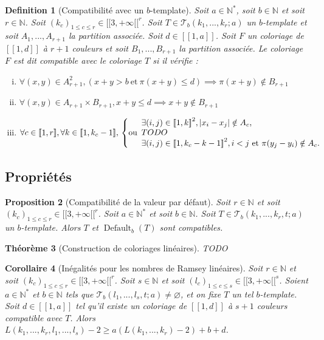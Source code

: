 \documentclass{article}
\newtheorem{definition}{Definition}[section]
\newtheorem{theorem}[definition]{Théorème}
\newtheorem{corollary}[definition]{Corollaire}
\newtheorem{proposition}[definition]{Proposition}
\DeclareMathOperator{\coldef}{Default}
\begin{document}
\begin{definition}[Compatibilité avec un \(b\)-template]
Soit \(a \in \mathbb{N}^*\), soit \(b \in \mathbb{N}\) et soit \(r \in \mathbb{N}\). Soit \((k_c)_{1 \leqslant c \leqslant r} \in {[\![3, + \infty [\![}^r\). Soit \(T \in \mathcal{T}_b(k_1, ..., k_r; a)\) un \(b\)-template et soit \(A_1, ..., A_{r+1}\) la partition associée. Soit \(d \in [\![1, a]\!]\). Soit \(F\) un coloriage de \([\![1, d]\!]\) à \(r +1\) couleurs et soit \(B_1, ..., B_{r + 1}\) la partition associée. Le coloriage \(F\)  est dit compatible avec le coloriage \(T\) si il vérifie :
\begin{enumerate}[(i)]
\item \(\forall (x,y) \in A_{r+1}^2, (x + y > b ~\text{et}~ \pi(x + y) \leqslant d) \implies \pi(x + y)  \notin B_{r+1}\)
\item \(\forall (x,y) \in A_{r+1} \times B_{r+1}, x + y \leqslant d \implies x + y  \notin B_{r+1}\)
\item \(\forall c \in [\![1, r]\!], \forall k \in [\![1, k_c-1]\!], \\
	\left\{ \text{ou} 
	\begin{array}{l}
		\exists (i, j) \in {[\![1, k]\!]}^2, |x_i - x_j| \notin A_c, \\
		TODO \\
		\exists (i, j) \in {[\![1, k_c - k - 1]\!]}^2, i < j ~\text{et}~ \pi(y_j - y_i) \notin A_c.
	\end{array}
	\right.\)
\end{enumerate}
\end{definition}

\subsection{Propriétés}

\begin{proposition}[Compatibilité de la valeur par défaut]
Soit \(r \in \mathbb{N}\) et soit \((k_c)_{1 \leqslant c \leqslant r}  \in {[\![3, +\infty[\![}^r\). Soit \(a \in \mathbb{N}^*\) et soit \(b \in \mathbb{N}\). Soit \(T \in \mathcal{T}_b(k_1, ..., k_r, t; a)\) un \(b\)-template. Alors \(T\) et \(\coldef_b(T)\) sont compatibles.
\end{proposition}

\begin{theorem}[Construction de coloriages linéaires]
\label{thm:b-temp}
TODO
\end{theorem}

\begin{corollary}[Inégalités pour les nombres de Ramsey linéaires]
Soit \(r \in \mathbb{N}\) et soit \((k_c)_{1 \leqslant c \leqslant r} \in {[\![3, +\infty[\![}^r\). Soit \(s \in \mathbb{N}\) et soit \((l_c)_{1 \leqslant c \leqslant s} \in {[\![3, +\infty[\![}^s\). Soient \(a \in \mathbb{N}^*\) et \(b \in \mathbb{N}\) tels que \(\mathcal{T}_b(l_1, ..., l_s, t; a) \neq \varnothing\), et on fixe \(T\) un tel \(b\)-template. Soit \(d \in [\![1, a]\!]\) tel qu'il existe un coloriage de \([\![1, d]\!]\) à \(s + 1\) couleurs compatible avec \(T\).
Alors \(L(k_1, ..., k_r, l_1, ..., l_s) - 2 \geqslant a (L(k_1, ..., k_r) - 2) + b + d\).
\end{corollary}
\end{document}
